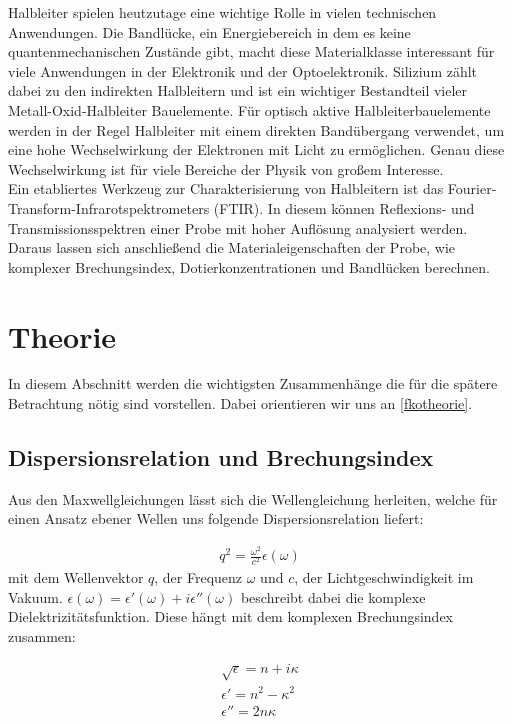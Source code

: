 \documentclass[paper=a4,fontsize=10pt,DIV=18,twocolumn,parskip=half]{scrartcl}
\numberwithin{equation}{section}    %
\begin{document}
Halbleiter spielen heutzutage eine wichtige Rolle in vielen technischen 
Anwendungen. Die Bandlücke, ein Energiebereich in dem es keine 
quantenmechanischen Zustände gibt, macht diese Materialklasse interessant für 
viele Anwendungen in der Elektronik und der Optoelektronik. Silizium zählt dabei 
zu den indirekten Halbleitern und ist ein wichtiger Bestandteil vieler 
Metall-Oxid-Halbleiter Bauelemente. Für optisch aktive Halbleiterbauelemente 
werden in der Regel Halbleiter mit einem direkten Bandübergang verwendet, um 
eine hohe Wechselwirkung der Elektronen mit Licht zu ermöglichen. Genau diese 
Wechselwirkung ist für viele Bereiche der Physik von großem Interesse. \\
Ein etabliertes Werkzeug zur Charakterisierung von Halbleitern ist das 
Fourier-Transform-Infrarotspektrometers (FTIR). In diesem können Reflexions- und 
Transmissionsspektren einer Probe mit hoher Auflösung analysiert werden. Daraus 
lassen sich anschließend die Materialeigenschaften der Probe, wie komplexer 
Brechungsindex, Dotierkonzentrationen und Bandlücken berechnen. 


\section{Theorie}
In diesem Abschnitt werden die wichtigsten Zusammenhänge die für die spätere 
Betrachtung nötig sind vorstellen. Dabei orientieren wir uns an 
\cref{fkotheorie}.

\subsection{Dispersionsrelation und Brechungsindex}

Aus den Maxwellgleichungen lässt sich die Wellengleichung herleiten, welche für 
einen Ansatz ebener Wellen uns folgende Dispersionsrelation liefert:

\begin{align}
    q^2 = \frac{\omega^2}{c^2}\epsilon(\omega)
\end{align}
mit dem Wellenvektor $q$, der Frequenz $\omega$ und $c$, der 
Lichtgeschwindigkeit im Vakuum.
$\epsilon(\omega)=\epsilon'(\omega)+i\epsilon''(\omega)$ beschreibt dabei die 
komplexe Dielektrizitätsfunktion. 
Diese hängt mit dem komplexen Brechungsindex zusammen:

\begin{align}
    \sqrt{\epsilon}=n+i\kappa \\
    \epsilon'=n^2-\kappa^2 \\
    \epsilon''=2n\kappa
\end{align}
\end{document}
